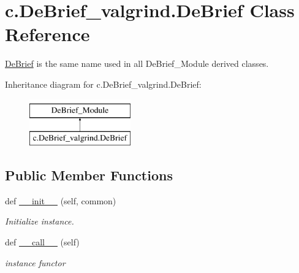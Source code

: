 \hypertarget{classc_1_1_de_brief__valgrind_1_1_de_brief}{}\section{c.\+De\+Brief\+\_\+valgrind.\+De\+Brief Class Reference}
\label{classc_1_1_de_brief__valgrind_1_1_de_brief}


\hyperlink{classc_1_1_de_brief__valgrind_1_1_de_brief}{De\+Brief} is the same name used in all De\+Brief\+\_\+\+Module derived classes.  


Inheritance diagram for c.\+De\+Brief\+\_\+valgrind.\+De\+Brief\+:\begin{figure}[H]
\begin{center}
\leavevmode
\includegraphics[height=2.000000cm]{classc_1_1_de_brief__valgrind_1_1_de_brief}
\end{center}
\end{figure}
\subsection*{Public Member Functions}
\begin{DoxyCompactItemize}
\item 
\hypertarget{classc_1_1_de_brief__valgrind_1_1_de_brief_a580f474af70f33862cead07c5f8ad324}{}def \hyperlink{classc_1_1_de_brief__valgrind_1_1_de_brief_a580f474af70f33862cead07c5f8ad324}{\+\_\+\+\_\+init\+\_\+\+\_\+} (self, common)\label{classc_1_1_de_brief__valgrind_1_1_de_brief_a580f474af70f33862cead07c5f8ad324}

\begin{DoxyCompactList}\small\item\em Initialize instance. \end{DoxyCompactList}\item 
def \hyperlink{classc_1_1_de_brief__valgrind_1_1_de_brief_aba1f8cf051c2586168c8f5ec8dc4791d}{\+\_\+\+\_\+call\+\_\+\+\_\+} (self)
\begin{DoxyCompactList}\small\item\em instance functor \end{DoxyCompactList}\end{DoxyCompactItemize}


